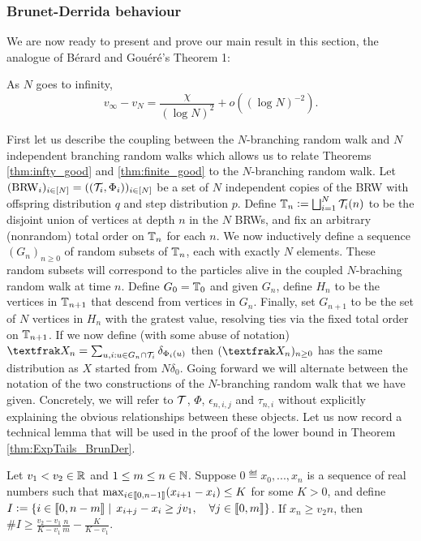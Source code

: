 \subsubsection{Brunet-Derrida behaviour}\label{sec:ExpTails_BrunDer}

We are now ready to present and prove our main result in this section, the analogue of Bérard and Gouéré's Theorem 1:
\begin{theorem}\label{thm:ExpTails_BrunDer}
As $N$ goes to infinity, 
\begin{equation*}
v_\infty - v_N = \frac{\chi}{(\log N)^2} + o((\log N)^{-2}). 
\end{equation*}
\end{theorem}

First let us describe the coupling between the $N$-branching random walk and $N$ independent branching random walks which allows us to relate Theorems \ref{thm:infty_good} and \ref{thm:finite_good} to the $N$-branching random walk. Let $(\text{BRW}_i)_{i \in [N]} = ((\cal{T}_i, \Phi_i))_{i \in [N]}$ be a set of $N$ independent copies of the BRW with offspring distribution $q$ and step distribution $p$. Define $\bb{T}_n \defeq \bigsqcup_{i=1}^N \cal{T}_i(n)$ to be the disjoint union of vertices at depth $n$ in the $N$ BRWs, and fix an arbitrary (nonrandom) total order on $\bb{T}_n$ for each $n$. We now inductively define a sequence $(G_n)_{n \geq 0}$ of random subsets of $\bb{T}_n$, each with exactly $N$ elements. These random subsets will correspond to the particles alive in the coupled $N$-braching random walk at time $n$. Define $G_0 = \bb{T}_0$ and given $G_n$, define $H_n$ to be the vertices in $\bb{T}_{n+1}$ that descend from vertices in $G_n$. Finally, set $G_{n+1}$ to be the set of $N$ vertices in $H_n$ with the gratest value, resolving ties via the fixed total order on $\bb{T}_{n+1}$. If we now define (with some abuse of notation) $\frak{X}_n = \sum_{u,i : u \in G_n \cap \cal{T}_i} \delta_{\Phi_i(u)}$ then $(\frak{X}_n)_{n \geq 0}$ has the same distribution as $X$ started from $N \delta_0$. Going forward we will alternate between the notation of the two constructions of the $N$-branching random walk that we have given. Concretely, we will refer to $\cal{T}$, $\Phi$, $\epsilon_{n,i,j}$ and $\tau_{n,i}$ without explicitly explaining the obvious relationships between these objects. Let us now record a technical lemma that will be used in the proof of the lower bound in Theorem \ref{thm:ExpTails_BrunDer}. 

\begin{lemma}\label{lem:ExpTailsGoodSequencesTechnical}
Let $v_1 < v_2 \in \R$ and $1 \leq m \leq n \in \N$. Suppose $0 \eqdef x_0, ..., x_n$ is a sequence of real numbers such that $\max_{i \in \bbracket{0, n - 1}} (x_{i+1} - x_i) \leq K$ for some $K > 0$, and define $I \defeq \{ i \in \bbracket{0, n - m} \mid\, x_{i + j} - x_i \geq j v_1,\quad \forall j\in\bbracket{0,m}\}$. If $x_n \geq v_2 n$, then $\#I \geq \frac{v_2 - v_1}{K - v_1}\frac{n}{m} - \frac{K}{K - v_1}$. 
\end{lemma}

